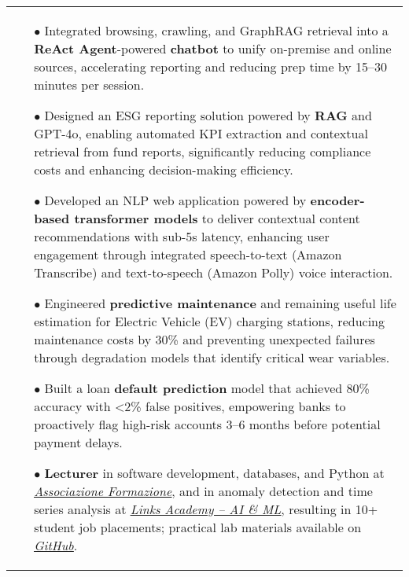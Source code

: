 \documentclass[11pt,a4paper,sans,english]{moderncv}
\makeatletter
\newcommand*{\mycvitem}[2][.25em]{%
	\vspace{-.25em}%
	\begin{tabular}{@{}p{\textwidth}@{}}%
		\small#2%
	\end{tabular}%
	\par\addvspace{-0.7em}}
\makeatother
\begin{document}
	\mycvitem{%
		\vspace*{-.2cm}
		\begin{itemize}
			\item[$\bullet$] Integrated browsing, crawling, and GraphRAG retrieval into a \textbf{ReAct Agent}-powered \textbf{chatbot} to unify on-premise and online sources, accelerating reporting and reducing prep time by 15–30 minutes per session.
			\item[$\bullet$] Designed an ESG reporting solution powered by \textbf{RAG} and GPT-4o, enabling automated KPI extraction and contextual retrieval from fund reports, significantly reducing compliance costs and enhancing decision-making efficiency.
			\item[$\bullet$] Developed an NLP web application powered by \textbf{encoder-based transformer models} to deliver contextual content recommendations with sub-5s latency, enhancing user engagement through integrated speech-to-text (Amazon Transcribe) and text-to-speech (Amazon Polly) voice interaction.
			\item[$\bullet$] Engineered \textbf{predictive maintenance} and remaining useful life estimation for Electric Vehicle (EV) charging stations, reducing maintenance costs by 30\% and preventing unexpected failures through degradation models that identify critical wear variables.
			\item[$\bullet$] Built a loan \textbf{default prediction} model that achieved 80\% accuracy with <2\% false positives, empowering banks to proactively flag high-risk accounts 3–6 months before potential payment delays.
			\item[$\bullet$] \textbf{Lecturer} in software development, databases, and Python at \href{https://www.associazioneformazione.it/formazione-professionale/ifts-tecnico-per-la-progettazione-e-lo-sviluppo-di-applicazioni-informatiche}{\textit{\underline{Associazione Formazione}}}, and in anomaly detection and time series analysis at \href{https://academy.linksmt.it/corso-di-formazione-post-laurea-artificial-intelligence-machine-learning/}{\textit{\underline{Links Academy – AI \& ML}}}, resulting in 10+ student job placements; practical lab materials available on \href{https://github.com/francesco-s/Links-Academy---Anomaly-Detection-Time-series-analysis}{\textit{\underline{GitHub}}}.	
	\end{itemize}}
	\vspace*{.25cm}
	
\end{document}
